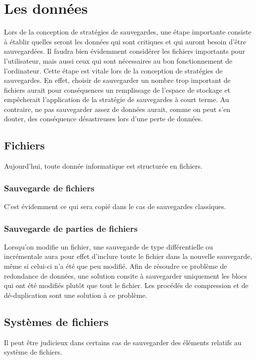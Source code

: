 \documentclass[a4paper,11pt]{report}
\begin{document}
\chapter{Les données}
Lors de la conception de stratégies de sauvegardes, une étape importante consiste à établir quelles seront les données qui sont critiques et qui auront besoin d'être sauvegardées.
Il faudra bien évidemment considérer les fichiers importants pour l'utilisateur, mais aussi ceux qui sont nécessaires au bon fonctionnement de l'ordinateur.
Cette étape est vitale lors de la conception de stratégies de sauvegardes. En effet, choisir de sauvegarder un nombre trop important de fichiers aurait pour conséquences un remplissage de l'espace de stockage et empêcherait l'application de la stratégie de sauvegardes à court terme.
Au contraire, ne pas sauvegarder assez de données aurait, comme on peut s'en douter, des conséquence désastreuses lors d'une perte de données.

\section{Fichiers}
Aujourd'hui, toute donnée informatique est structurée en fichiers.

\subsection{Sauvegarde de fichiers}
C'est évidemment ce qui sera copié dans le cas de sauvegardes classiques.

\subsection{Sauvegarde de parties de fichiers}
Lorsqu'on modifie un fichier, une sauvegarde de type différentielle ou incrémentale aura pour effet d'inclure toute le fichier dans la nouvelle sauvegarde, même si celui-ci n'a été que peu modifié.
Afin de résoudre ce problème de redondance de données, une solution consite à sauvegarder uniquement les blocs qui ont été modifiés plutôt que tout le fichier.
Les procédés de compression et de dé-duplication sont une solution à ce problème.

\section{Systèmes de fichiers}
Il peut être judicieux dans certains cas de sauvegarder des éléments relatifs au système de fichiers.
\end{document}

